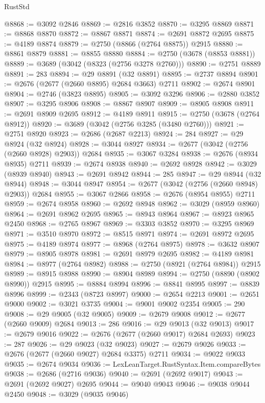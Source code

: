 \begin{lexlean}{RustStd}
\begin{coremodule}
@8868 := @3092 @2846
@8869 := @2816 @3852
@8870 := @3295 @8869
@8871 := @8868 @8870
@8872 := @8867 @8871
@8874 := @2691 @8872 @2695
@8875 := @4189 @8874
@8879 := @2750 (@8866 (@2764 @8875)) @2915
@8880 := @8861 @8879
@8881 := @8855 @8880
@8884 := @2750 (@3678 (@8853 @8881))
@8889 := @3689 (@3042 (@8323 (@2756 @3278 @2760)))
@8890 := @2751 @8889
@8891 := 283
@8894 := @29 @8891 (@32 @8891)
@8895 := @2737 @8894
@8901 := @2676 (@2677 (@2660 @8895) @2684 @3663) @2711
@8902 := @2674 @8901
@8904 := @2746 (@3823 @8895)
@8905 := @3092 @3296
@8906 := @2880 @3852
@8907 := @3295 @8906
@8908 := @8867 @8907
@8909 := @8905 @8908
@8911 := @2691 @8909 @2695
@8912 := @4189 @8911
@8915 := @2750 (@3678 (@2764 @8912))
@8920 := @3689 (@3042 (@2756 @3285 (@3480 @2760)))
@8921 := @2751 @8920
@8923 := @2686 (@2687 @2213)
@8924 := 284
@8927 := @29 @8924 (@32 @8924)
@8928 := @3044 @8927
@8934 := @2677 (@3042 (@2756 (@2660 @8928) @2903)) @2684
@8935 := @3067 @3284
@8938 := @2676 (@8934 @8935) @2711
@8939 := @2674 @8938
@8940 := @2692 @8928
@8942 := @3029 (@8939 @8940)
@8943 := @2691 @8942
@8944 := 285
@8947 := @29 @8944 (@32 @8944)
@8948 := @3044 @8947
@8954 := @2677 (@3042 (@2756 (@2660 @8948) @2903)) @2684
@8955 := @3067 @2866
@8958 := @2676 (@8954 @8955) @2711
@8959 := @2674 @8958
@8960 := @2692 @8948
@8962 := @3029 (@8959 @8960)
@8964 := @2691 @8962 @2695
@8965 := @8943 @8964
@8967 := @8923 @8965 @2450
@8968 := @2765 @8967
@8969 := @3303 @3852
@8970 := @3295 @8969
@8971 := @3510 @8970
@8972 := @8515 @8971
@8974 := @2691 @8972 @2695
@8975 := @4189 @8974
@8977 := @8968 (@2764 @8975)
@8978 := @3632 @8907
@8979 := @8905 @8978
@8981 := @2691 @8979 @2695
@8982 := @4189 @8981
@8984 := @8977 (@2764 @8982)
@8988 := @2750 (@8921 (@2764 @8984)) @2915
@8989 := @8915 @8988
@8990 := @8904 @8989
@8994 := @2750 (@8890 (@8902 @8990)) @2915
@8995 := @8884 @8994
@8996 := @8841 @8995
@8997 := @8839 @8996
@8999 := @2343 (@8723 @8997)
@9000 := @2654 @2213
@9001 := @2651 @9000
@9002 := @3021 @3735
@9004 := @9001 @9002 @2354
@9005 := 290
@9008 := @29 @9005 (@32 @9005)
@9009 := @2679 @9008
@9012 := @2677 (@2660 @9009) @2684
@9013 := 286
@9016 := @29 @9013 (@32 @9013)
@9017 := @2679 @9016
@9022 := @2676 (@2677 (@2660 @9017) @2684 @2693)
@9023 := 287
@9026 := @29 @9023 (@32 @9023)
@9027 := @2679 @9026
@9033 := @2676 (@2677 (@2660 @9027) @2684 @3375) @2711
@9034 := @9022 @9033
@9035 := @2674 @9034
@9036 := LexLeanTarget.RustSyntax.Item.compareBytes
@9038 := @2686 (@2716 @9036)
@9040 := @2691 (@2692 @9017)
@9043 := @2691 (@2692 @9027) @2695
@9044 := @9040 @9043
@9046 := @9038 @9044 @2450
@9048 := @3029 (@9035 @9046)

\end{coremodule}
\end{lexlean}
